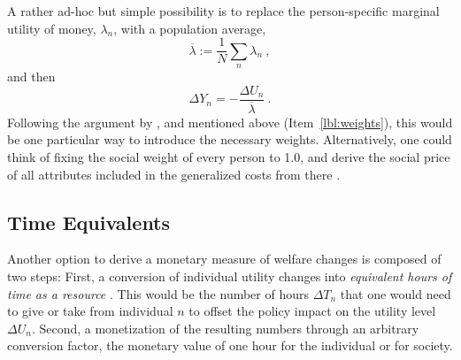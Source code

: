 %
A rather ad-hoc but simple possibility is to replace the person-specific marginal utility of money, $\lambda_n$, with a population average,
\begin{equation}
\overline\lambda := \frac{1}{N} \sum_n \lambda_n \ ,
\label{eq:av-utl-of-income}
\end{equation}
and then
\begin{equation}
\Delta Y_n = - \frac{\Delta U_n}{\overline\lambda} \ .
\label{eq:using-av-utl-of-income}
\end{equation}
%
Following the argument by \cite{Fowkes2010ValueOfTTS}, \cite{OECD2006CBA} and \cite{GuehnemannEtAl2011MethodologyReportMCA} mentioned above (Item~\ref{lbl:weights}), this would be one particular way to introduce the necessary weights.
%
Alternatively, one could think of fixing the social weight of every person to 1.0, and derive the social price of all attributes included in the generalized costs from there \citep[][p.108f]{JaraDiaz2007TransportEconomicTheory}.



\subsection{Time Equivalents}
\label{ch:economicEval:aggregatingValues:time}


Another option to derive a monetary measure of welfare changes is composed of two steps:
%
First, a conversion of individual utility changes into \emph{equivalent hours of time as a resource} \citep{JaradiazEtc2008ValueOfLeisure, MackieJara-DiazFowkesTt-savings}. This would be the number of hours $\Delta T_n$ that one would need to give or take from individual $n$  to offset the policy impact on the utility level $\Delta U_n$.
%
Second, a monetization of the resulting numbers through an arbitrary conversion factor, \ie the monetary value of one hour for the individual or for society.

